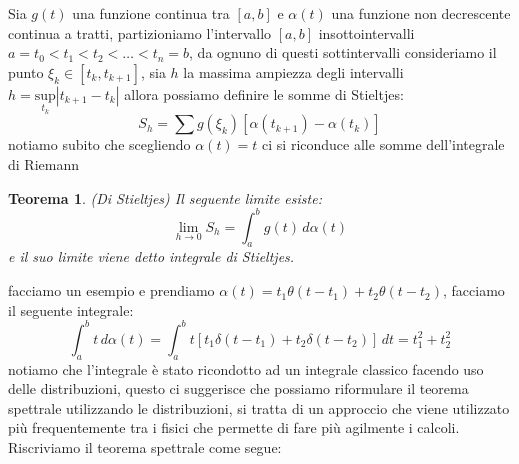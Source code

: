 \documentclass[12pt]{book}
\theoremstyle{plain}
\newtheorem{thm}{Teorema}[section]
\theoremstyle{definition}
\theoremstyle{remark}
\begin{document}
\begin{figure}[H]
\centering
\begin{minipage}{.5\textwidth}
\centering
{}
\end{minipage}%
\begin{minipage}{.5\textwidth}
\centering
{}
\end{minipage}
\end{figure}
Sia $g(t)$ una funzione continua tra $[a,b]$ e $\alpha(t)$ una funzione non decrescente continua a tratti, partizioniamo l'intervallo $[a,b]$ insottointervalli $a = t_0 <t_1<t_2<\dots <t_n = b$, da ognuno di questi sottintervalli consideriamo il punto $\xi_k \in [t_k,t_{k+1}]$, sia $h$ la massima ampiezza degli intervalli $h = \underset{t_k}{\text{sup}}|t_{k+1}-t_k|$ allora possiamo definire le somme di Stieltjes:
\[S_h = \sum g(\xi_k)[\alpha(t_{k+1}) -\alpha(t_k)]\]
notiamo subito che scegliendo $\alpha(t) = t$ ci si riconduce alle somme dell'integrale di Riemann
\begin{thm}(Di Stieltjes)
Il seguente limite esiste:
\[\lim_{h\to 0} S_h = \int_a^b g(t)\,d\alpha(t) \]
e il suo limite viene detto integrale di Stieltjes.
\end{thm}
facciamo un esempio e prendiamo $\alpha(t) = t_1\theta(t-t_1) + t_2\theta(t-t_2)$, facciamo il seguente integrale:
\[\int_a^b t \,d\alpha(t) = \int_a^b t[t_1\delta(t-t_1) + t_2 \delta(t-t_2)]\,dt = t_1^2+t_2^2  \]
notiamo che l'integrale è stato ricondotto ad un integrale classico facendo uso delle distribuzioni, questo ci suggerisce che possiamo riformulare il teorema spettrale utilizzando le distribuzioni, si tratta di un approccio che viene utilizzato più frequentemente tra i fisici che permette di fare più agilmente i calcoli. Riscriviamo il teorema spettrale come segue:
\end{document}
